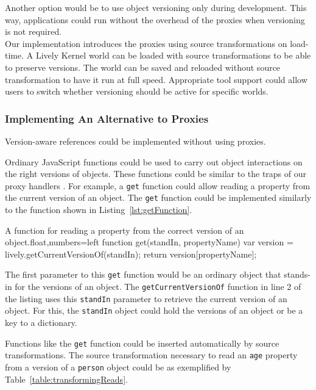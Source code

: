 Another option would be to use object versioning only during development.
This way, applications could run without the overhead of the proxies when versioning is not required.\\
Our implementation introduces the proxies using source transformations on load-time.
A Lively Kernel world can be loaded with source transformations to be able to preserve versions.
The world can be saved and reloaded without source transformation to have it run at full speed.
Appropriate tool support could allow users to switch whether versioning should be active for specific worlds.


\subsubsection{Implementing An Alternative to Proxies}

Version-aware references could be implemented without using proxies.

Ordinary JavaScript functions could be used to carry out object interactions on the right versions of objects.
These functions could be similar to the traps of our proxy handlers .
For example, a \lstinline{get} function could allow reading a property from the current version of an object.
The \lstinline{get} function could be implemented similarly to the function shown in Listing~\ref{lst:getFunction}.

\iffalse
\begin{verbatim}\fi
\begin{code}{A function for reading a property from the correct version of an object.}{float,numbers=left}
function get(standIn, propertyName) {
    var version = lively.getCurrentVersionOf(standIn);
    return version[propertyName];
}
\end{code}
\iffalse
\end{verbatim}\fi

The first parameter to this \lstinline{get} function would be an ordinary object that stands-in for the versions of an object.
The \lstinline{getCurrentVersionOf} function in line 2 of the listing uses this \lstinline{standIn} parameter to retrieve the current version of an object.
For this, the \lstinline{standIn} object could hold the versions of an object or be a key to a dictionary.

Functions like the \lstinline{get} function could be inserted automatically by source transformations.
The source transformation necessary to read an \lstinline{age} property from a version of a \lstinline{person} object could be as exemplified by Table~\ref{table:transformingReads}.

